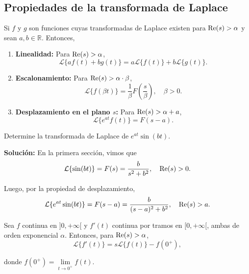 


\subsection{Propiedades de la transformada de Laplace}    

\begin{teorema}
    Si $f$ y $g$ son funciones cuyas transformadas de Laplace existen para $\operatorname{Re}(s) > \alpha$ y sean $a, b \in \mathbb{R}$. Entonces, 
\begin{enumerate}
    \item \textbf{Linealidad:} Para $\operatorname{Re}(s) > \alpha$,
    $$\mathcal{L}\{a f(t) + b g(t)\} = a \mathcal{L}\{f(t)\} + b \mathcal{L}\{g(t)\}.$$ 

    \item \textbf{Escalonamiento:} Para $\operatorname{Re}(s) > \alpha \cdot \beta$,
    $$\mathcal{L}\{f(\beta t) \} = \frac{1}{\beta} F \left( \frac{s}{\beta}\right), \quad \beta > 0.$$ 
    
    \item \textbf{Desplazamiento en el plano $s$:} Para $\operatorname{Re}(s) > \alpha + a$,
    $$\mathcal{L}\{e^{at} f(t)\} = F(s-a).$$
\end{enumerate}
\end{teorema}

\begin{ejemplo}
    Determine la transformada de Laplace de $e^{at} \sin(bt)$.

    \textbf{Solución:} En la primera sección, vimos que
    $$\mathcal{L}\{\sin(bt)\} = F(s) = \frac{b}{s^2+b^2}, \quad \operatorname{Re}(s) > 0.$$

    Luego, por la propiedad de desplazamiento,
    $$\mathcal{L}\{e^{at} \sin(bt)\} = F(s-a) = \frac{b}{(s-a)^2+b^2}, \quad \operatorname{Re}(s) > a.$$
\end{ejemplo}

\begin{teorema}
    Sea $f$ continua en $]0, + \infty [$ y $f'(t)$ continua por tramos en $[0, + \infty[$, ambas de orden exponencial $\alpha$. Entonces, para $\operatorname{Re}(s) > \alpha$,
    $$\mathcal{L}\{f'(t)\} = s \mathcal{L}\{f(t)\} - f(0^+),$$

    donde $f(0^+) = \lim\limits_{t \to 0^+} f(t)$. 
\end{teorema}

